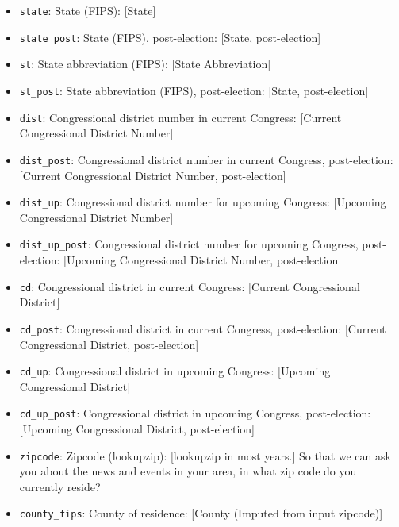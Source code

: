 \documentclass[10pt,article,oneside]{memoir}
\begin{document}
\begin{itemize}
\tightlist
\item
  \texttt{state}: State (FIPS): {[}State{]}
\item
  \texttt{state\_post}: State (FIPS), post-election: {[}State,
  post-election{]}
\item
  \texttt{st}: State abbreviation (FIPS): {[}State Abbreviation{]}
\item
  \texttt{st\_post}: State abbreviation (FIPS), post-election: {[}State,
  post-election{]}
\item
  \texttt{dist}: Congressional district number in current Congress:
  {[}Current Congressional District Number{]}
\item
  \texttt{dist\_post}: Congressional district number in current
  Congress, post-election: {[}Current Congressional District Number,
  post-election{]}
\item
  \texttt{dist\_up}: Congressional district number for upcoming
  Congress: {[}Upcoming Congressional District Number{]}
\item
  \texttt{dist\_up\_post}: Congressional district number for upcoming
  Congress, post-election: {[}Upcoming Congressional District Number,
  post-election{]}
\item
  \texttt{cd}: Congressional district in current Congress: {[}Current
  Congressional District{]}
\item
  \texttt{cd\_post}: Congressional district in current Congress,
  post-election: {[}Current Congressional District, post-election{]}
\item
  \texttt{cd\_up}: Congressional district in upcoming Congress:
  {[}Upcoming Congressional District{]}
\item
  \texttt{cd\_up\_post}: Congressional district in upcoming Congress,
  post-election: {[}Upcoming Congressional District, post-election{]}
\item
  \texttt{zipcode}: Zipcode (lookupzip): {[}lookupzip in most years.{]}
  So that we can ask you about the news and events in your area, in what
  zip code do you currently reside?
\item
  \texttt{county\_fips}: County of residence: {[}County (Imputed from
  input zipcode){]}
\end{itemize}
\end{document}

